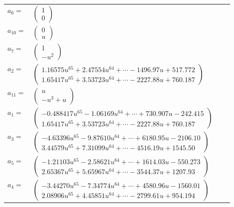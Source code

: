\documentclass[1p]{elsarticle_modified}
\theoremstyle{definition}
\begin{document}
\begin{tabular}{m{7pt} m{180pt} m{7pt} m{180pt} }
\flushright $a_{6}=$&$\begin{pmatrix}1\\0\end{pmatrix}$ \\
\flushright $a_{10}=$&$\begin{pmatrix}0\\u\end{pmatrix}$ \\
\flushright $a_{7}=$&$\begin{pmatrix}1\\- u^2\end{pmatrix}$ \\
\flushright $a_{2}=$&$\begin{pmatrix}1.16575 u^{65}+2.47554 u^{64}+\cdots-1496.97 u+517.772\\1.65417 u^{65}+3.53723 u^{64}+\cdots-2227.88 u+760.187\end{pmatrix}$ \\
\flushright $a_{11}=$&$\begin{pmatrix}u\\- u^3+u\end{pmatrix}$ \\
\flushright $a_{1}=$&$\begin{pmatrix}-0.488417 u^{65}-1.06169 u^{64}+\cdots+730.907 u-242.415\\1.65417 u^{65}+3.53723 u^{64}+\cdots-2227.88 u+760.187\end{pmatrix}$ \\
\flushright $a_{3}=$&$\begin{pmatrix}-4.63396 u^{65}-9.87610 u^{64}+\cdots+6180.95 u-2106.10\\3.44579 u^{65}+7.31099 u^{64}+\cdots-4516.19 u+1545.50\end{pmatrix}$ \\
\flushright $a_{5}=$&$\begin{pmatrix}-1.21103 u^{65}-2.58621 u^{64}+\cdots+1614.03 u-550.273\\2.65367 u^{65}+5.65967 u^{64}+\cdots-3544.37 u+1207.93\end{pmatrix}$ \\
\flushright $a_{4}=$&$\begin{pmatrix}-3.44270 u^{65}-7.34774 u^{64}+\cdots+4580.96 u-1560.01\\2.08906 u^{65}+4.45851 u^{64}+\cdots-2799.61 u+954.194\end{pmatrix}$ \\

\end{tabular}
\end{document}
